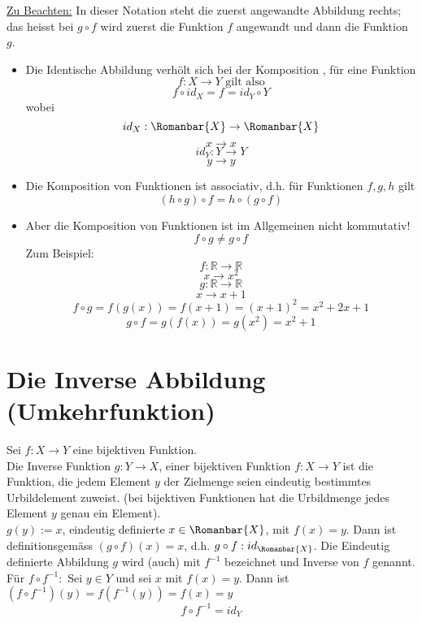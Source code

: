 \underline{Zu Beachten:}
In dieser Notation steht die zuerst angewandte Abbildung rechts; das heisst bei $g\circ f$ wird zuerst die Funktion $f$ angewandt und dann die Funktion $g$. 
\begin{itemize}
\item Die Identische Abbildung verhölt sich bei der Komposition , für eine Funktion $$f:X\rightarrow Y \text{ gilt also}$$
$$f\circ id_X=f=id_Y \circ Y$$ wobei $$id_X:\Romanbar{X}\rightarrow\Romanbar{X}$$$$x\rightarrow x$$ $$id_Y :Y\rightarrow Y$$$$y\rightarrow y$$

\item Die Komposition von Funktionen ist associativ, d.h. für Funktionen $f,g,h$ gilt $$\left( h\circ g\right)\circ f=h\circ \left( g\circ f\right)$$
\item Aber die Komposition von Funktionen ist im Allgemeinen nicht kommutativ! $$f\circ g\not= g\circ f$$
Zum Beispiel:
$$f:\mathbb{R}\rightarrow\mathbb{R}$$$$x\rightarrow x^2$$$$g:\mathbb{R}\rightarrow\mathbb{R}$$$$x\rightarrow x+1$$
$$f\circ g=f\left( g(x)\right)=f(x+1)=(x+1)^2=x^2+2x+1$$$$g\circ f=g\left( f(x)\right)=g(x^2)=x^2+1$$
\end{itemize}

\section{Die Inverse Abbildung (Umkehrfunktion)}
Sei $f:X\rightarrow Y$ eine bijektiven Funktion. \\

Die Inverse Funktion $g:Y\rightarrow X$, einer bijektiven Funktion $f:X\rightarrow Y$ ist die Funktion, die jedem Element $y$ der Zielmenge seien eindeutig bestimmtes Urbildelement zuweist. (bei bijektiven Funktionen hat die Urbildmenge jedes Element $y$ genau ein Element). \\

 $g(y):=x$, eindeutig definierte $ x\in\Romanbar{X}$, mit $f(x)=y$. Dann ist definitionsgemäss $(g\circ f)(x)=x$, d.h. $g\circ f:id_{\Romanbar{X}}$. Die Eindeutig definierte Abbildung $g$ wird (auch) mit $f^{-1}$ bezeichnet und Inverse von $f$ genannt.\\

Für $f\circ f^{-1}:$ Sei $y\in Y$ und sei $x$ mit $f(x)=y$. Dann ist $\left( f\circ f^{-1}\right)(y)=f\left(f^{-1}(y)\right)=f(x)=y$ $$f\circ f^{-1}=id_Y$$

